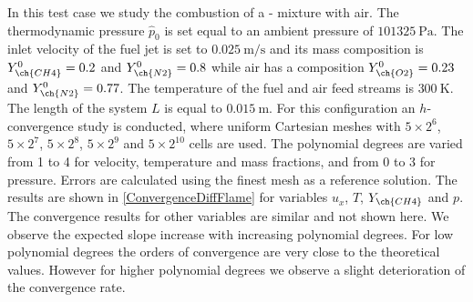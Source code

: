 In this test case we study the combustion of a - mixture with air. The thermodynamic pressure $\hat p_0$ is set equal to an ambient pressure of $\SI{101325}{\pascal}$. The inlet velocity of the fuel jet is set to $\SI{0.025}{\meter \per \second}$ and its mass composition is $Y^0_{\ch{CH4}} = 0.2$ and $Y^0_{\ch{N2}} = 0.8$ while air has a composition $Y^0_{\ch{O2}} = 0.23$ and $Y^0_{\ch{N2}} = 0.77$. The temperature of the fuel and air feed streams is $\SI{300}{\kelvin}$. The length of the system $L$ is equal to $\SI{0.015}{\meter}$.
For this configuration an $h$-convergence study is conducted, where uniform Cartesian meshes with  $5\times2^6$, $5\times2^7$, $5\times2^8$,  $5\times2^9$ and $5\times2^{10}$  cells are used. The polynomial degrees are varied from 1 to 4 for velocity, temperature and mass fractions, and from 0 to 3 for pressure.  Errors are calculated using the finest mesh as a reference solution.  The results are shown in \cref{ConvergenceDiffFlame} for variables $u_x$, $T$, $Y_{\ch{CH4}}$ and $p$. The convergence results for other variables are similar and not shown here. We observe the expected slope increase with increasing polynomial degrees. For low polynomial degrees the orders of convergence are very close to the theoretical values. However for higher polynomial degrees we observe a slight deterioration of the convergence rate.
\FloatBarrier
